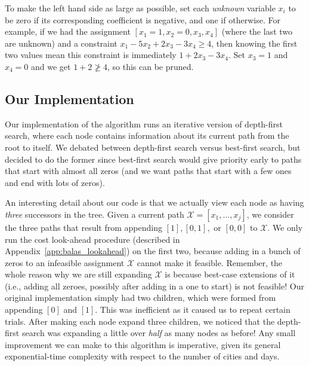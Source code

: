 \documentclass{article}
\begin{document}
To make the left hand side as large as possible, set each \emph{unknown} variable $x_i$ to be zero if its corresponding coefficient is negative, and
one if otherwise. For example, if we had the assignment $[x_1=1, x_2=0, x_3, x_4]$ (where the last two are unknown) and a constraint $x_1 - 5x_2 +
2x_3 -3x_4 \ge 4$, then knowing the first two values mean this constraint is immediately $1 + 2x_3 - 3x_4$. Set $x_3=1$ and $x_4=0$ and we get $1+2
\not \ge 4$, so this can be pruned.

\subsection{Our Implementation}

Our implementation of the algorithm runs an iterative version of depth-first search, where each node contains information about its current path from
the root to itself. We debated between depth-first search versus best-first search, but decided to do the former since best-first search would give
priority early to paths that start with almost all zeros (and we want paths that start with a few ones and end with lots of zeros).

An interesting detail about our code is that we actually view each node as having \emph{three} successors in the tree. Given a current path
$\mathcal{X} = [x_1, \ldots, x_j]$, we consider the three paths that result from appending $[1],[0,1],$ or $[0,0]$ to $\mathcal{X}$. We only run the
cost look-ahead procedure (described in Appendix~\ref{app:balas_lookahead}) on the first two, because adding in a bunch of zeros to an infeasible
assignment $\mathcal{X}$ cannot make it feasible. Remember, the whole reason why we are still expanding $\mathcal{X}$ is because best-case extensions
of it (i.e., adding all zeroes, possibly after adding in a one to start) is not feasible! Our original implementation simply had two children, which
were formed from appending $[0]$ and $[1]$. This was inefficient as it caused us to repeat certain trials. After making each node expand three
children, we noticed that the depth-first search was expanding a little over \emph{half} as many nodes as before! Any small improvement we can make to
this algorithm is imperative, given its general exponential-time complexity with respect to the number of cities and days.
\end{document}
